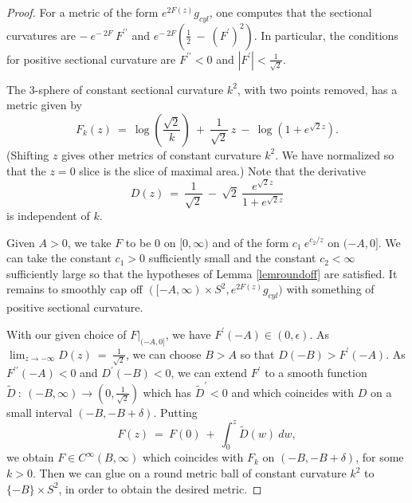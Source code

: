 \begin{proof}
For a metric of the form $e^{2F(z)} g_{cyl}$, one computes that
the sectional curvatures are
$ - \: e^{- \: 2F} \: F^{\prime \prime}$ and $e^{- \: 2F}
\left( \frac12 \: - \: (F^\prime)^2 \right)$.
In particular, the conditions for positive sectional curvature
are $F^{\prime \prime} < 0$ and $|F^\prime| <
\frac{1}{\sqrt{2}}$.

The $3$-sphere of constant sectional curvature $k^2$,
with two points removed, has a metric given by
\begin{equation}
F_k(z) \: = \:  \log \left( \frac{\sqrt{2}}{k} \right) \: + \:
\frac{1}{\sqrt{2}} \: z \: - \: \log \left( 1 + e^{\sqrt{2} z} \right).
\end{equation}
(Shifting $z$ gives other metrics of constant curvature $k^2$.
We have normalized so that the $z=0$ slice is the slice of maximal area.)
Note that the derivative
\begin{equation}
D(z) \: = \: \frac{1}{\sqrt{2}} \: - \:
\sqrt{2} \: \frac{e^{\sqrt{2} z}}{1+e^{\sqrt{2} z}}
\end{equation}
is independent of $k$.

Given $A > 0$, we take $F$ to be $0$ on $[0, \infty)$ and of the form
$c_1 \: e^{c_2/z}$ on $(-A, 0]$. We can take the constant
$c_1 > 0$ sufficiently small and the constant $c_2 < \infty$ sufficiently large
so that the hypotheses of Lemma \ref{lemroundoff} are satisfied. It
remains to smoothly cap off
$([-A, \infty) \times S^2, e^{2F(z)} g_{cyl})$ with something of positive
sectional curvature.

With our given choice of $F \big|_{(-A, 0]}$, we have
$F^\prime(-A) \in (0, \epsilon)$. As
$\lim_{z \rightarrow -\infty}
D(z) \: = \: \frac{1}{\sqrt{2}}$,
we can choose $B > A$
so that $D(-B) > F^\prime(-A)$. As $F^{\prime \prime}(-A) < 0$ and
$D^{\prime}(-B) < 0$, we can extend $F^\prime$ to a smooth function
$\widetilde{D} \: : \: (-B, \infty) \rightarrow \left( 0,
\frac{1}{\sqrt{2}} \right)$
which has $\widetilde{D}^\prime < 0$ and which
coincides with $D$ on a small interval $(-B, -B + \delta)$.
Putting
\begin{equation}
F(z) \: = \: F(0) \: + \: \int_0^z \widetilde{D}(w) \: dw,
\end{equation}
we obtain
$F \in C^\infty(B, \infty)$ which coincides with $F_k$ on
$(-B, -B + \delta)$, for some $k > 0$. Then we can glue on a round metric
ball of constant curvature $k^2$ to $\{-B\} \times S^2$, in order to
obtain the desired metric.
\end{proof}


